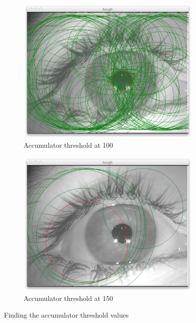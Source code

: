 \documentclass[a4paper,11pt]{article}
\begin{document}
\begin{figure}[H]
\centering
\begin{subfigure}{.5\textwidth}
  \centering
  \includegraphics[width=.8\linewidth]{hough100}
  \caption{Accumulator threshold at 100}
  \label{fig:sub1}
\end{subfigure}%
\begin{subfigure}{.5\textwidth}
  \centering
  \includegraphics[width=.8\linewidth]{hough150}
  \caption{Accumulator threshold at 150}
  \label{fig:sub2}
\end{subfigure}
\caption{Finding the accumulator threshold values}
\label{fig:test}
\end{figure}
\end{document}
